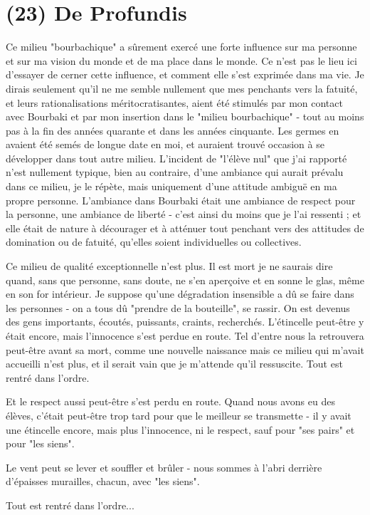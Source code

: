 \section{(23) De Profundis}

Ce milieu "bourbachique" a sûrement exercé une forte influence sur ma personne et sur ma vision du monde et de ma place dans le monde. Ce n'est pas le lieu ici d'essayer de cerner cette influence, et comment elle s'est exprimée dans ma vie. Je dirais seulement qu'il ne me semble nullement que mes penchants vers la fatuité, et leurs rationalisations méritocratisantes, aient été stimulés par mon contact avec Bourbaki et par mon insertion dans le "milieu bourbachique" - tout au moins pas à la fin des années quarante et dans les années cinquante. Les germes en avaient été semés de longue date en moi, et auraient trouvé occasion à se développer dans tout autre milieu. L'incident de "l'élève nul" que j'ai rapporté n'est nullement typique, bien au contraire, d'une ambiance qui aurait prévalu dans ce milieu, je le répète, mais uniquement d'une attitude ambiguë en ma propre personne. L'ambiance dans Bourbaki était une ambiance de respect pour la personne, une ambiance de liberté - c'est ainsi du moins que je l'ai ressenti ; et elle était de nature à décourager et à atténuer tout penchant vers des attitudes de domination ou de fatuité, qu'elles soient individuelles ou collectives.

Ce milieu de qualité exceptionnelle n'est plus. Il est mort je ne saurais dire quand, sans que personne, sans doute, ne s'en aperçoive et en sonne le glas, même en son for intérieur. Je suppose qu'une dégradation insensible a dû se faire dans les personnes - on a tous dû "prendre de la bouteille", se rassir. On est devenus des gens importants, écoutés, puissants, craints, recherchés. L'étincelle peut-être y était encore, mais l'innocence s'est perdue en route. Tel d'entre nous la retrouvera peut-être avant sa mort, comme une nouvelle naissance mais ce milieu qui m'avait accueilli n'est plus, et il serait vain que je m'attende qu'il ressuscite. Tout est rentré dans l'ordre.

Et le respect aussi peut-être s'est perdu en route. Quand nous avons eu des élèves, c'était peut-être trop tard pour que le meilleur se transmette - il y avait une étincelle encore, mais plus l'innocence, ni le respect, sauf pour "ses pairs" et pour "les siens".

Le vent peut se lever et souffler et brûler - nous sommes à l'abri derrière d'épaisses murailles, chacun, avec "les siens".

Tout est rentré dans l'ordre...